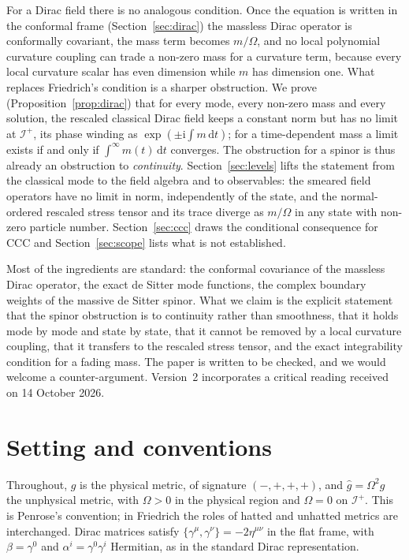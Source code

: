 \documentclass[11pt,a4paper]{article}
\theoremstyle{definition}
\newcommand{\scri}{\mathscr{I}^{+}}
\newcommand{\dd}{\mathrm{d}}
\newcommand{\ii}{\mathrm{i}}
\newcommand{\hg}{\hat g}
\begin{document}
For a Dirac field there is no analogous condition. Once the equation is written in the conformal frame (Section~\ref{sec:dirac}) the massless Dirac operator is conformally covariant, the mass term becomes $m/\Omega$, and no local polynomial curvature coupling can trade a non-zero mass for a curvature term, because every local curvature scalar has even dimension while $m$ has dimension one. What replaces Friedrich's condition is a sharper obstruction. We prove (Proposition~\ref{prop:dirac}) that for every mode, every non-zero mass and every solution, the rescaled classical Dirac field keeps a constant norm but has no limit at $\scri$, its phase winding as $\exp(\pm\ii\int m\,\dd t)$; for a time-dependent mass a limit exists if and only if $\int^{\infty}m(t)\,\dd t$ converges. The obstruction for a spinor is thus already an obstruction to \emph{continuity}. Section~\ref{sec:levels} lifts the statement from the classical mode to the field algebra and to observables: the smeared field operators have no limit in norm, independently of the state, and the normal-ordered rescaled stress tensor and its trace diverge as $m/\Omega$ in any state with non-zero particle number. Section~\ref{sec:ccc} draws the conditional consequence for CCC and Section~\ref{sec:scope} lists what is not established.

Most of the ingredients are standard: the conformal covariance of the massless Dirac operator, the exact de Sitter mode functions, the complex boundary weights of the massive de Sitter spinor. What we claim is the explicit statement that the spinor obstruction is to continuity rather than smoothness, that it holds mode by mode and state by state, that it cannot be removed by a local curvature coupling, that it transfers to the rescaled stress tensor, and the exact integrability condition for a fading mass. The paper is written to be checked, and we would welcome a counter-argument. Version~2 incorporates a critical reading received on 14 October 2026.

\section{Setting and conventions}
\label{sec:setting}

Throughout, $g$ is the physical metric, of signature $(-,+,+,+)$, and $\hg=\Omega^{2}g$ the unphysical metric, with $\Omega>0$ in the physical region and $\Omega=0$ on $\scri$. This is Penrose's convention; in Friedrich \cite{Friedrich2014} the roles of hatted and unhatted metrics are interchanged. Dirac matrices satisfy $\{\gamma^{\mu},\gamma^{\nu}\}=-2\eta^{\mu\nu}$ in the flat frame, with $\beta=\gamma^{0}$ and $\alpha^{i}=\gamma^{0}\gamma^{i}$ Hermitian, as in the standard Dirac representation.
\end{document}
